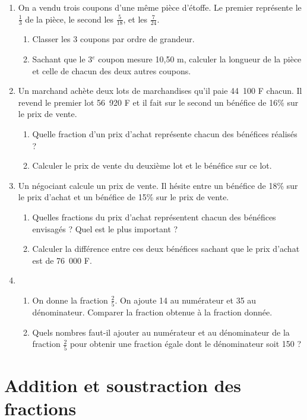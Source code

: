\documentclass[12 pt]{report}
\theoremstyle{plain}
\newcounter{n}
\begin{document}
\begin{enumerate}
\item On a vendu trois coupons d'une même pièce d'étoffe. Le premier représente le $\frac13$ de la pièce, le second les $\frac5{18}$, et les $\frac{7}{24}$. \begin{enumerate}
\item Classer les 3 coupons par ordre de grandeur. 
\item Sachant que le 3${}^e$ coupon mesure 10,50 m, 
calculer la longueur de la pièce et celle de chacun des deux autres coupons. 
\end{enumerate}
\item Un marchand achète deux lots de marchandises qu'il paie 44~100 F chacun. Il revend le premier lot 56~920 F et il fait sur le second un bénéfice de 16\% sur le prix de vente. \begin{enumerate}
\item Quelle fraction d'un prix d'achat représente chacun des bénéfices réalisés ? 
\item Calculer le prix de vente du deuxième lot et 
le bénéfice sur ce lot. 
\end{enumerate} 
\item Un négociant calcule un prix de vente. Il hésite entre un bénéfice de 18\% sur le prix d'achat et un bénéfice de 15\% sur le prix de vente. \begin{enumerate}
\item Quelles fractions du prix d'achat représentent chacun des bénéfices envisagés ? Quel est le plus important ? 
\item Calculer la différence entre ces deux bénéfices 
sachant que le prix d'achat est de 76~000 F. 
\end{enumerate}
\item \begin{enumerate}
\item On donne la fraction $\frac25$. On ajoute 14 au numérateur et 35 au dénominateur. Comparer la fraction obtenue à la fraction donnée. 
\item Quels nombres faut-il ajouter au numérateur et au dénominateur de la fraction $\frac25$ pour obtenir une fraction égale dont le dénominateur soit 150 ?
\end{enumerate}
\end{enumerate}

\chapter{Addition et soustraction des fractions}
\end{document}
